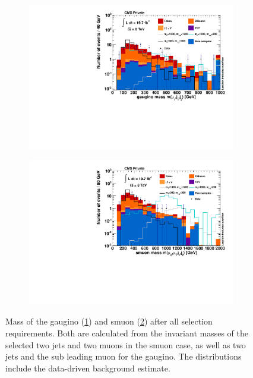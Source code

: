 \begin{figure}[htb!]
  \centering
  \begin{subfigure}[b]{0.6\textwidth}
    \centering
    \includegraphics[width=\textwidth]{plots/m_gaugino.pdf}
    \caption{\label{fig:m_gaugino}}
  \end{subfigure}
  \begin{subfigure}[b]{0.6\textwidth}
    \centering
    \includegraphics[width=\textwidth]{plots/m_smuon.pdf}
    \caption{\label{fig:m_smuon}}
  \end{subfigure}
  \caption{Mass of the gaugino (\ref{fig:m_gaugino}) and smuon (\ref{fig:m_smuon}) after all selection requirements. Both are calculated from the invariant masses of the selected two jets and two muons in the smuon case, as well as two jets and the sub leading muon for the gaugino. The distributions include the data-driven background estimate.}
  \label{fig:final-dist}
\end{figure}


